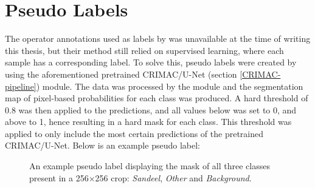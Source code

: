     \section{Pseudo Labels} \label{Pseudo label}
        The operator annotations used as labels by \citeauthor{brautaset2020acoustic}\cite{brautaset2020acoustic} was unavailable at the time of writing this thesis, but their method still relied on supervised learning, where each sample has a corresponding label. To solve this, pseudo labels were created by using the aforementioned pretrained CRIMAC/U-Net (section \ref{CRIMAC-pipeline}) module. The data was processed by the module and the segmentation map of pixel-based probabilities for each class was produced. A hard threshold of 0.8 was then applied to the predictions, and all values below was set to 0, and above to 1, hence resulting in a hard mask for each class. This threshold was applied to only include the most certain predictions of the pretrained CRIMAC/U-Net. Below is an example pseudo label:
        

        \begin{figure}[H]
        \centering
        	\label{subfig:correct}
        	
        
        
        
        \caption[Pseudo label]{An example pseudo label displaying the mask of all three classes present in a 256×256 crop: \textit{Sandeel}, \textit{Other} and \textit{Background}.} %
        \label{data sample fig}
        
        \end{figure}


